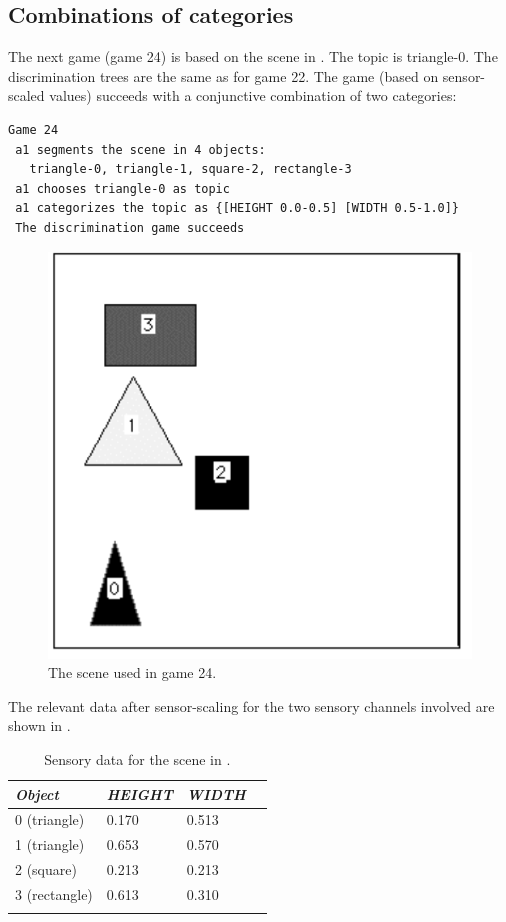 \subsection{Combinations of categories}

The next game (game 24) is based on the scene in 
. The topic is triangle-0. 
The discrimination trees are the same as for
game 22. The game (based on sensor-scaled values)
succeeds with a conjunctive combination of two
categories: 
\begin{verbatim}
Game 24
 a1 segments the scene in 4 objects: 
   triangle-0, triangle-1, square-2, rectangle-3 
 a1 chooses triangle-0 as topic
 a1 categorizes the topic as {[HEIGHT 0.0-0.5] [WIDTH 0.5-1.0]}
 The discrimination game succeeds
\end{verbatim}

\begin{figure}[htbp]
  \centerline{\includegraphics[width=.40\textwidth]{chap4/figs/game24}}
\caption{\label{scene4} The scene used in game 24.}
\end{figure}
The relevant data after sensor-scaling for the 
two sensory channels involved are shown in . 

\begin{table}
\begin{center}
\begin{tabular}{ l  l  l  l }
\lsptoprule
{\itshape Object} & {\itshape HEIGHT} & {\itshape WIDTH} \\ \midrule
0 (triangle) & 0.170 & 0.513  \\ 
1 (triangle) & 0.653 & 0.570 \\  
2 (square) & 0.213 & 0.213 \\  
3 (rectangle) & 0.613 & 0.310 \\  
\lspbottomrule
\end{tabular}
\caption{\label{tab:t-game24} Sensory data for the scene in .}
\end{center}
\end{table}

